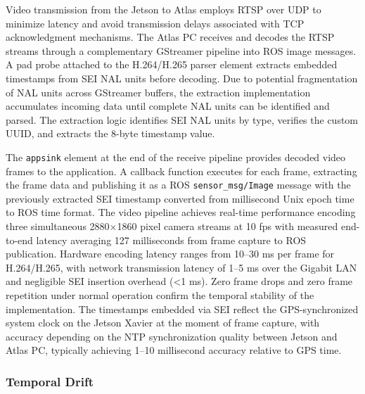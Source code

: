 Video transmission from the Jetson to Atlas employs \ac{RTSP} over \ac{UDP} to minimize latency and avoid transmission delays associated with TCP acknowledgment mechanisms. The Atlas PC receives and decodes the \ac{RTSP} streams through a complementary GStreamer pipeline into ROS image messages. A pad probe attached to the H.264/H.265 parser element extracts embedded timestamps from \ac{SEI} \ac{NAL} units before decoding. Due to potential fragmentation of \ac{NAL} units across GStreamer buffers, the extraction implementation accumulates incoming data until complete \ac{NAL} units can be identified and parsed. The extraction logic identifies \ac{SEI} \ac{NAL} units by type, verifies the custom UUID, and extracts the 8-byte timestamp value.

The \texttt{appsink} element at the end of the receive pipeline provides decoded video frames to the application. A callback function executes for each frame, extracting the frame data and publishing it as a ROS \texttt{sensor\_msg/Image} message with the previously extracted \ac{SEI} timestamp converted from millisecond Unix epoch time to ROS time format. 
The video pipeline achieves real-time performance encoding three simultaneous 2880$\times$1860 pixel camera streams at 10 fps with measured end-to-end latency averaging 127 milliseconds from frame capture to ROS publication. Hardware encoding latency ranges from 10--30 ms per frame for H.264/H.265, with network transmission latency of 1--5 ms over the Gigabit LAN and negligible \ac{SEI} insertion overhead (<1 ms). Zero frame drops and zero frame repetition under normal operation confirm the temporal stability of the implementation. The timestamps embedded via \ac{SEI} reflect the GPS-synchronized system clock on the Jetson Xavier at the moment of frame capture, with accuracy depending on the \ac{NTP} synchronization quality between Jetson and Atlas PC, typically achieving 1--10 millisecond accuracy relative to GPS time.
            
            \subsubsection{Temporal Drift} \label{temporal_drift}
            
